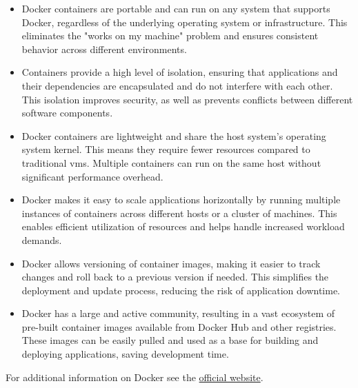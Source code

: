 \begin{itemize}
  \item Docker containers are portable and can run on any system that supports Docker, regardless of the underlying operating system or infrastructure. This eliminates the "works on my machine" problem and ensures consistent behavior across different environments.
  \item Containers provide a high level of isolation, ensuring that applications and their dependencies are encapsulated and do not interfere with each other. This isolation improves security, as well as prevents conflicts between different software components.
  \item Docker containers are lightweight and share the host system's operating system kernel. This means they require fewer resources compared to traditional \glspl{vm}. Multiple containers can run on the same host without significant performance overhead.
  \item Docker makes it easy to scale applications horizontally by running multiple instances of containers across different hosts or a cluster of machines. This enables efficient utilization of resources and helps handle increased workload demands.
  \item Docker allows versioning of container images, making it easier to track changes and roll back to a previous version if needed. This simplifies the deployment and update process, reducing the risk of application downtime.
  \item Docker has a large and active community, resulting in a vast ecosystem of pre-built container images available from Docker Hub and other registries. These images can be easily pulled and used as a base for building and deploying applications, saving development time.
\end{itemize}
For additional information on Docker see the \href{https://www.docker.com/}{official website}.
